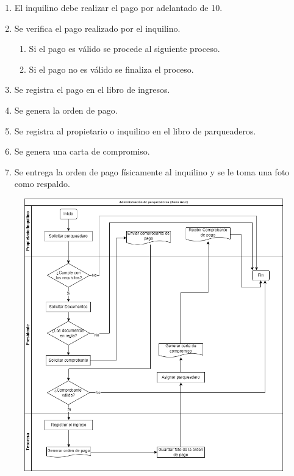 \begin{itemize}
\begin{enumerate}
        \item El inquilino debe realizar el pago por adelantado de 10\textdollar.
        \item Se verifica el pago realizado por el inquilino.
        \begin{enumerate}
            \item Si el pago es válido se procede al siguiente proceso.
            \item Si el pago no es válido se finaliza el proceso.
        \end{enumerate}
        \item Se registra el pago en el libro de ingresos.
        \item Se genera la orden de pago.
        \item Se registra al propietario o inquilino en el libro de parqueaderos.
        \item Se genera una carta de compromiso.
        \item Se entrega la orden de pago físicamente al inquilino y se le toma una foto como respaldo.
    \end{enumerate}
    \begin{figure}[H]
        \centering
        \includegraphics[width=1\textwidth]{resources/images/Diagramade flujo parqueadero-actual}

\end{figure}
\end{itemize}
